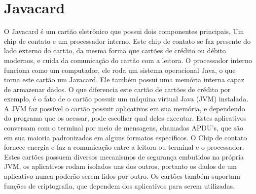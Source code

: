 \documentclass{article}
\begin{document}
	\section{Javacard\cite{JAVACHEN}}
		\begin{justify}
			

				\hspace{2cm} O Javacard é um cartão eletrônico que possui dois componentes principais, Um chip de contato e um processador interno. Este chip de contato se faz presente do lado externo do cartão, da mesma forma que cartões de crédito ou débito modernos, e cuida da comunicação do cartão com a leitora. O processador interno funciona como um computador, ele roda um sistema operacional Java, o que torna este cartão um Javacard. Ele também possui uma memória interna capaz de armazenar dados. O que diferencia este cartão de cartões de crédito por exemplo, é o fato de o cartão possuir um máquina virtual Java (JVM) instalada. A JVM faz possível o cartão possuir aplicativos em sua memória, e dependendo do programa que os acessar, pode escolher qual deles executar. Estes aplicativos conversam com o terminal por meio de mensagens, chamadas APDU's, que são em sua maioria padronizadas em alguns formatos específicos. O Chip de contato fornece energia e faz a comunicação entre a leitora ou terminal e o processador. Estes cartões possuem diversos mecanismos de segurança embutidos na própria JVM, os aplicativos rodam isolados uns dos outros, portanto os dados de um aplicativo nunca poderão serem lidos por outro. Os cartões também suportam funções de criptografia, que dependem dos aplicativos para serem utilizadas.

			
		\end{justify}
\end{document}
